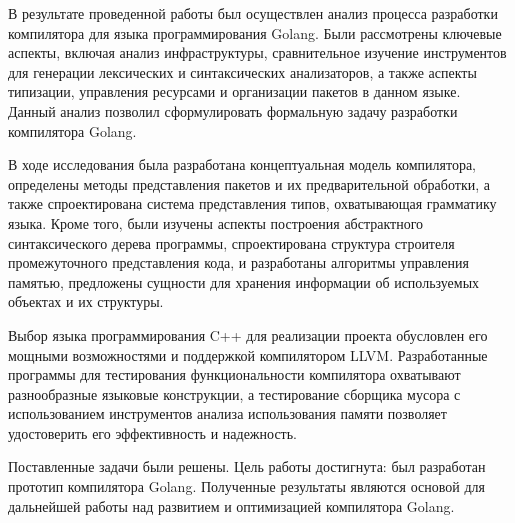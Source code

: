 \Conclusion %

В результате проведенной работы был осуществлен анализ процесса разработки компилятора для языка программирования Golang.
Были рассмотрены ключевые аспекты, включая анализ инфраструктуры, сравнительное изучение инструментов для генерации лексических и синтаксических анализаторов, а также аспекты типизации, управления ресурсами и организации пакетов в данном языке.
Данный анализ позволил сформулировать формальную задачу разработки компилятора Golang.

В ходе исследования была разработана концептуальная модель компилятора, определены методы представления пакетов и их предварительной обработки, а также спроектирована система представления типов, охватывающая грамматику языка.
Кроме того, были изучены аспекты построения абстрактного синтаксического дерева программы, спроектирована структура строителя промежуточного представления кода, и разработаны алгоритмы управления памятью, предложены сущности для хранения информации об используемых объектах и их структуры.

Выбор языка программирования C++ для реализации проекта обусловлен его мощными возможностями и поддержкой компилятором LLVM.
Разработанные программы для тестирования функциональности компилятора охватывают разнообразные языковые конструкции, а тестирование сборщика мусора с использованием инструментов анализа использования памяти позволяет удостоверить его эффективность и надежность.

Поставленные задачи были решены.
Цель работы достигнута: был разработан прототип компилятора Golang.
Полученные результаты являются основой для дальнейшей работы над развитием и оптимизацией компилятора Golang.


